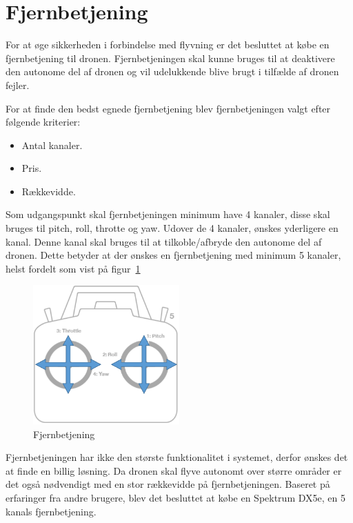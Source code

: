 \section{Fjernbetjening}

For at øge sikkerheden i forbindelse med flyvning er det besluttet at købe en fjernbetjening til dronen. Fjernbetjeningen skal kunne bruges til at deaktivere den autonome del af dronen og vil udelukkende blive brugt i tilfælde af dronen fejler. 

For at finde den bedst egnede fjernbetjening blev fjernbetjeningen valgt efter følgende kriterier:

\begin{itemize}
	\item Antal kanaler.
	\item Pris.
	\item Rækkevidde.
\end{itemize}

Som udgangspunkt skal fjernbetjeningen minimum have 4 kanaler, disse skal bruges til pitch, roll, throtte og yaw. Udover de 4 kanaler, ønskes yderligere en kanal. Denne kanal skal bruges til at tilkoble/afbryde den autonome del af dronen. Dette betyder at der ønskes en fjernbetjening med minimum 5 kanaler, helst fordelt som vist på figur~\ref{fig:fjernbetjening} 

\begin{figure}[H]
\centering
\includegraphics[width=0.5\textwidth]{Billeder/Fjernbetjening}
\caption{Fjernbetjening}
\label{fig:fjernbetjening}
\end{figure}

Fjernbetjeningen har ikke den største funktionalitet i systemet, derfor ønskes det at finde en billig løsning. Da dronen skal flyve autonomt over større områder er det også nødvendigt med en stor rækkevidde på fjernbetjeningen. Baseret på erfaringer fra andre brugere, blev det besluttet at købe en Spektrum DX5e, en 5 kanals fjernbetjening.